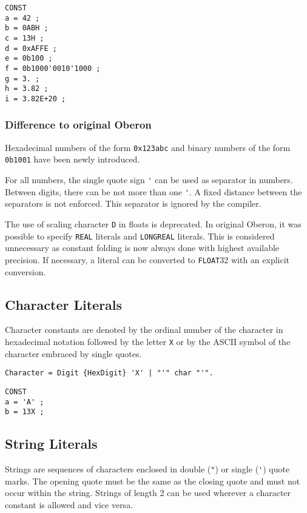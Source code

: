 \documentclass[a4wide,11pt]{article}
\newcommand{\FLOAT}{\lstinline"FLOAT"}
\begin{document}
\begin{annotation}
\begin{lstlisting}[style=example,caption=Examples of Number Literals in constant declarations]
CONST
a = 42 ;
b = 0ABH ;
c = 13H ;
d = 0xAFFE ;
e = 0b100 ;
f = 0b1000'0010'1000 ;
g = 3. ;
h = 3.82 ;
i = 3.82E+20 ;
\end{lstlisting}

\subsubsection{Difference to original Oberon}
Hexadecimal numbers of the form \lstinline"0x123abc" and binary numbers of the form \lstinline"0b1001" have been newly introduced.

For all numbers, the single quote sign \lstinline"'" can be used as separator in numbers.
Between digits, there can be not more than one \lstinline"'".
A fixed distance between the separators is not enforced.
This separator is ignored by the compiler.

The use of scaling character \lstinline"D" in floats is deprecated.
In original Oberon, it was possible to specify \verb"REAL" literals and \verb"LONGREAL" literals.
This is considered unnecessary as constant folding is now always done with highest available precision.
If necessary, a literal can be converted to \FLOAT32 with an explicit conversion.

\end{annotation}

\subsection{Character Literals}
Character constants are denoted by the ordinal number of the character in hexadecimal notation followed by the letter \verb~X~ or by the ASCII symbol of the character embraced by single quotes.
\begin{lstlisting}[style=ebnf]
Character = Digit {HexDigit} 'X' | "'" char "'".
\end{lstlisting}

\begin{annotation}
\begin{lstlisting}[style=example,caption= Examples of Character Literals in constant declarations]
CONST
a = 'A' ;
b = 13X ;
\end{lstlisting}
\end{annotation}

\subsection{String Literals}
Strings are sequences of characters enclosed in double (\verb~"~) or single (\verb~'~) quote marks.
The opening quote must be the same as the closing quote and must not occur within the string.
Strings of length 2 can be used wherever a character constant is allowed and vice versa.
\end{document}
